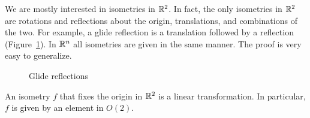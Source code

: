  
 
We are mostly interested in isometries in ${\Bbb R}^2$. In fact, the
only isometries in ${\Bbb R}^2$ are rotations and reflections  about
the origin, translations, and combinations of the two. For example, a
{\bfi glide reflection\/} is a translation
followed by a reflection (Figure~\ref{Glide}).   In ${\Bbb R}^n$ all
isometries are given in the same manner. The proof is very easy to
generalize. 
 
 
\begin{figure}[htb]

\begin{center}
\end{center}
\caption{Glide reflections}
\label{Glide}
\end{figure}
 
 
\begin{lemma}
An isometry $f$ that fixes the origin in ${\Bbb R}^2$ is a linear
transformation.  In particular, $f$ is given by an element in $O(2)$. 
\end{lemma}
 
